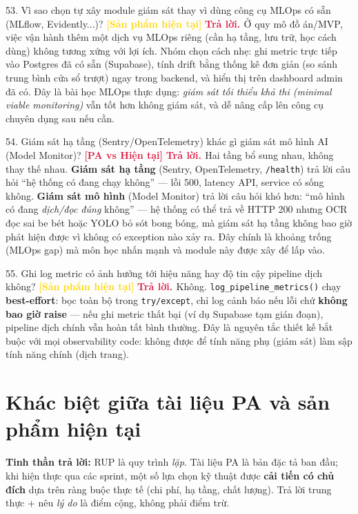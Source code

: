 \documentclass[11pt]{article}
\newcommand{\tagSP}{\textcolor{gold}{\footnotesize\textbf{[Sản phẩm hiện tại]}}}
\newcommand{\tagBoth}{\textcolor{crimson}{\footnotesize\textbf{[PA vs Hiện tại]}}}
\newcommand{\A}{\textbf{\textcolor{crimson}{Trả lời. }}}
\begin{document}
\begin{qa}{53. Vì sao chọn tự xây module giám sát thay vì dùng công cụ MLOps có sẵn (MLflow, Evidently...)? \tagSP}
\A Ở quy mô đồ án/MVP, việc vận hành thêm một dịch vụ MLOps riêng (cần hạ tầng, lưu trữ, học cách dùng) không tương xứng với lợi ích. Nhóm chọn cách nhẹ: ghi metric trực tiếp vào Postgres đã có sẵn (Supabase), tính drift bằng thống kê đơn giản (so sánh trung bình cửa sổ trượt) ngay trong backend, và hiển thị trên dashboard admin đã có. Đây là bài học MLOps thực dụng: \textit{giám sát tối thiểu khả thi (minimal viable monitoring)} vẫn tốt hơn không giám sát, và dễ nâng cấp lên công cụ chuyên dụng sau nếu cần.
\end{qa}

\begin{qa}{54. Giám sát hạ tầng (Sentry/OpenTelemetry) khác gì giám sát mô hình AI (Model Monitor)? \tagBoth}
\A Hai tầng bổ sung nhau, không thay thế nhau. \textbf{Giám sát hạ tầng} (Sentry, OpenTelemetry, \texttt{/health}) trả lời câu hỏi ``hệ thống có đang chạy không'' --- lỗi 500, latency API, service có sống không. \textbf{Giám sát mô hình} (Model Monitor) trả lời câu hỏi khó hơn: ``mô hình có đang \textit{dịch/đọc đúng} không'' --- hệ thống có thể trả về HTTP 200 nhưng OCR đọc sai be bét hoặc YOLO bỏ sót bong bóng, mà giám sát hạ tầng không bao giờ phát hiện được vì không có exception nào xảy ra. Đây chính là khoảng trống (MLOps gap) mà môn học nhấn mạnh và module này được xây để lấp vào.
\end{qa}

\begin{qa}{55. Ghi log metric có ảnh hưởng tới hiệu năng hay độ tin cậy pipeline dịch không? \tagSP}
\A Không. \texttt{log\_pipeline\_metrics()} chạy \textbf{best-effort}: bọc toàn bộ trong \texttt{try/except}, chỉ log cảnh báo nếu lỗi chứ \textbf{không bao giờ raise} --- nếu ghi metric thất bại (ví dụ Supabase tạm gián đoạn), pipeline dịch chính vẫn hoàn tất bình thường. Đây là nguyên tắc thiết kế bắt buộc với mọi observability code: không được để tính năng phụ (giám sát) làm sập tính năng chính (dịch trang).
\end{qa}

\section{Khác biệt giữa tài liệu PA và sản phẩm hiện tại}

\begin{tcolorbox}[colback=crimson!5,colframe=crimson,sharp corners,boxrule=0.6pt]
\small\textbf{Tinh thần trả lời:} RUP là quy trình \textit{lặp}. Tài liệu PA là bản đặc tả ban đầu; khi hiện thực qua các sprint, một số lựa chọn kỹ thuật được \textbf{cải tiến có chủ đích} dựa trên ràng buộc thực tế (chi phí, hạ tầng, chất lượng). Trả lời trung thực + nêu \textit{lý do} là điểm cộng, không phải điểm trừ.
\end{tcolorbox}
\end{document}
